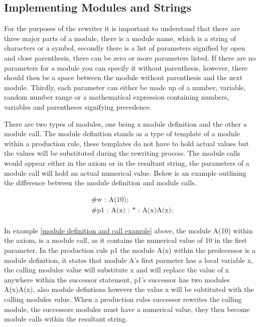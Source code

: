 \subsection{Implementing Modules and Strings}

For the purposes of the rewriter it is important to understand that there are three major parts of a module, there is a module name, which is a string of characters or a symbol, secondly there is a list of parameters signified by open and close parenthesis, there can be zero or more parameters listed. If there are no parameters for a module you can specify it without parenthesis, however, there should then be a space between the module without parenthesis and the next module. Thirdly, each parameter can either be made up of a number, variable, random number range or a mathematical expression containing  numbers, variables and parentheses signifying precedence. 

There are two types of modules, one being a module definition and the other a module call. The module definition stands as a type of template of a module within a production rule, these templates do not have to hold actual values but the values will be substituted during the rewriting process. The module calls would appear either in the axiom or in the resultant string, the parameters of a module call will hold an actual numerical value. Below is an example outlining the difference between the module definition and module calls.

\begin{equation} \label{module definition and call example}
\begin{aligned}
	&\text{\#w : A(10);}\\
	&\text{\#p1 : A(x) : * : A(x)A(x); }\\
\end{aligned}
\end{equation}

In example \ref{module definition and call example} above, the module A(10) within the axiom, is a module call, as it contains the numerical value of 10 in the first parameter. In the production rule p1 the module A(x) within the predecessor is a module definition, it states that module A's first parmeter has a local variable x, the calling modules value will substitute x and will replace the value of x anywhere within the successor statement, p1's successor has two modules A(x)A(x), also module defintions however the value x will be subtituted with the calling modules value. When a production rules successor rewrites the calling module, the successors modules must have a numerical value, they then become module calls within the resultant string.

